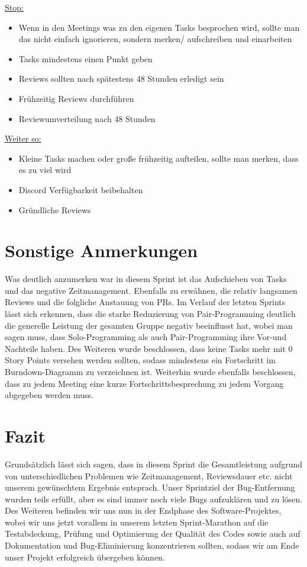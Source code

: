 \documentclass[12pt,a4paper, oneside]{article}
\begin{document}
\underline{Stop:}

\begin{itemize}
    \item Wenn in den Meetings was zu den eigenen Tasks besprochen wird, sollte man das nicht einfach ignorieren, sondern merken/ aufschreiben und einarbeiten
    \item Tasks mindestens einen Punkt geben
    \item Reviews sollten nach spätestens 48 Stunden erledigt sein
    \item Frühzeitig Reviews durchführen
    \item Reviewumverteilung nach 48 Stunden
\end{itemize}

\underline{Weiter so:}

\begin{itemize}
    \item Kleine Tasks machen oder große frühzeitig aufteilen, sollte man merken, dass es zu viel wird
    \item Discord Verfügbarkeit beibehalten
    \item Gründliche Reviews
\end{itemize}

\newpage

\section{Sonstige Anmerkungen}

Was deutlich anzumerken war in diesem Sprint ist das Aufschieben von Tasks und das negative Zeitmanagement.
Ebenfalls zu erwähnen, die relativ langsamen Reviews und die folgliche Anstauung von PRs.
Im Verlauf der letzten Sprints lässt sich erkennen, dass die starke Reduzierung von Pair-Programming deutlich die generelle Leistung der gesamten
Gruppe negativ beeinflusst hat, wobei man sagen muss, dass Solo-Programming als auch Pair-Programming ihre Vor-und Nachteile haben.
Des Weiteren wurde beschlossen, dass keine Tasks mehr mit 0 Story Points versehen werden sollten, sodass mindestens ein Fortschritt im
Burndown-Diagramm zu verzeichnen ist. Weiterhin wurde ebenfalls beschlossen, dass zu jedem Meeting eine kurze Fortschrittsbesprechung zu jedem
Vorgang abgegeben werden muss.

\section{Fazit}

Grundsätzlich lässt sich sagen, dass in diesem Sprint die Gesamtleistung aufgrund von unterschiedlichen Problemen wie Zeitmanagement, Reviewsdauer etc.
nicht unserem gewünschtem Ergebnis entsprach. Unser Sprintziel der Bug-Entfernung wurden teils erfüllt, aber es sind immer noch viele Bugs
aufzuklären und zu lösen. Des Weiteren befinden wir uns nun in der Endphase des Software-Projektes, wobei wir uns jetzt vorallem in unserem letzten
Sprint-Marathon auf die Testabdeckung, Prüfung und Optimierung der Qualität des Codes sowie auch auf Dokumentation und Bug-Eliminierung konzentrieren
sollten, sodass wir am Ende unser Projekt erfolgreich übergeben können.
\end{document}
